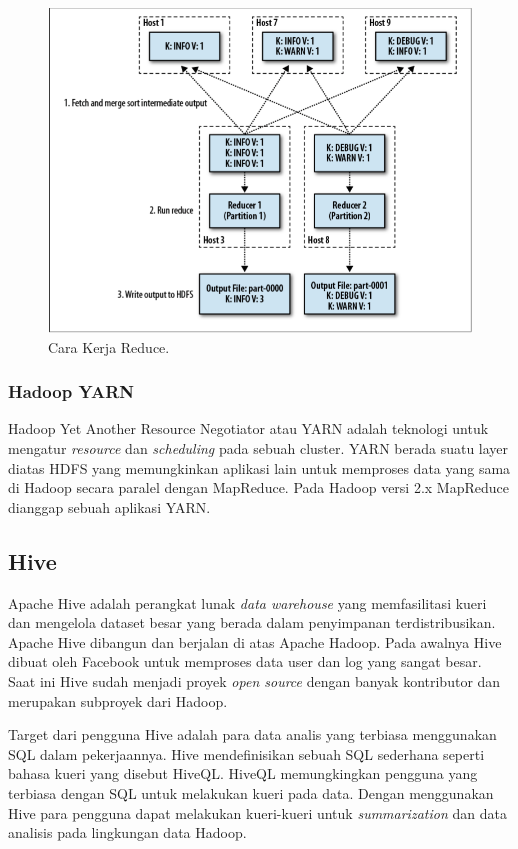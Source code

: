 \begin{figure}
	\centering
	\includegraphics[scale=0.5]{Gambar/how-reducer-works.png}
	\caption[Cara  Kerja Reduce]{Cara Kerja Reduce.\cite{sammer2012hadoop}}
	\label{fig:reducer_works}
\end{figure}
	
\subsubsection{Hadoop YARN}
Hadoop Yet Another Resource Negotiator atau YARN adalah teknologi untuk mengatur \textit{resource} dan \textit{scheduling} pada sebuah cluster. YARN berada suatu layer diatas HDFS yang memungkinkan aplikasi lain untuk memproses data yang sama di Hadoop secara paralel dengan MapReduce. Pada Hadoop versi 2.x MapReduce dianggap sebuah aplikasi YARN.

\subsection{Hive}
\label{sec:hive}
Apache Hive adalah perangkat lunak \textit{data warehouse} yang memfasilitasi kueri dan mengelola dataset besar yang berada dalam penyimpanan terdistribusikan. Apache Hive dibangun dan berjalan di atas Apache Hadoop. Pada awalnya Hive dibuat oleh Facebook untuk memproses data user dan log yang sangat besar. Saat ini Hive sudah menjadi proyek \textit{open source} dengan banyak kontributor dan merupakan subproyek dari Hadoop.  

Target dari pengguna Hive adalah para data analis yang terbiasa menggunakan SQL dalam pekerjaannya. Hive mendefinisikan sebuah SQL sederhana seperti bahasa kueri yang disebut HiveQL. HiveQL memungkingkan pengguna yang terbiasa dengan SQL untuk melakukan kueri pada data. Dengan menggunakan Hive para pengguna dapat melakukan kueri-kueri untuk \textit{summarization} dan data analisis pada lingkungan data Hadoop. 

